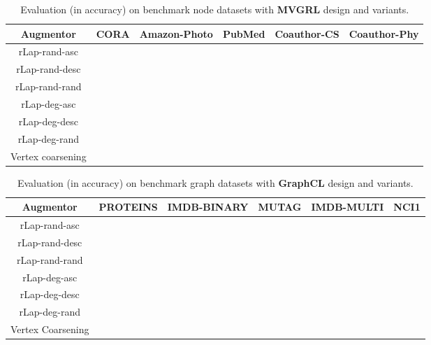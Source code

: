 \documentclass{article}
\theoremstyle{plain}
\theoremstyle{definition}
\theoremstyle{remark}
\begin{document}
\begin{table*}[ht!]
\centering
\caption{Evaluation (in accuracy) on benchmark node datasets with \textbf{MVGRL} design and  variants.}
\label{table:rlap_ablation_mvgrl}
\vskip 0.15in
\begin{center}
\begin{small}
\begin{sc}
\begin{tabular}{c|c|c|c|c|c}
\toprule
Augmentor & CORA & Amazon-Photo & PubMed & Coauthor-CS & Coauthor-Phy \\
\midrule
rLap-rand-asc &  &  &   &   &  \\
rLap-rand-desc &  &   &  &  & \underline{}  \\
rLap-rand-rand &  &  &    &   &  \\
rLap-deg-asc &  &   &  &  &   \\
rLap-deg-desc & \underline{} &  &  & \underline{}  &   \\
rLap-deg-rand &  &  & \underline{} &  &   \\
Vertex coarsening &  &  \underline{} &  &  &  \\
\bottomrule
\end{tabular}
\end{sc}
\end{small}
\end{center}
\vskip -0.1in
\end{table*}

\begin{table*}[ht!]
\centering
\caption{Evaluation (in accuracy) on benchmark graph datasets with \textbf{GraphCL} design and  variants.}
\label{table:rlap_ablation_graphcl}
\vskip 0.15in
\begin{center}
\begin{small}
\begin{sc}
\begin{tabular}{c|c|c|c|c|c}
\toprule
Augmentor & PROTEINS & IMDB-BINARY & MUTAG & IMDB-MULTI & NCI1\\
\midrule
rLap-rand-asc &  &   &   &  &   \\
rLap-rand-desc &  &  & \underline{} & \underline{} &  \\
rLap-rand-rand &  &  &  &  & \\
rLap-deg-asc & \underline{} &   &  &  &   \\
rLap-deg-desc &  & \underline{} &   &  & \underline{}  \\
rLap-deg-rand &  &  &  &  &  \\
Vertex Coarsening &  &   &  &  & \\
\bottomrule
\end{tabular}
\end{sc}
\end{small}
\end{center}
\vskip -0.1in
\end{table*}
\end{document}
